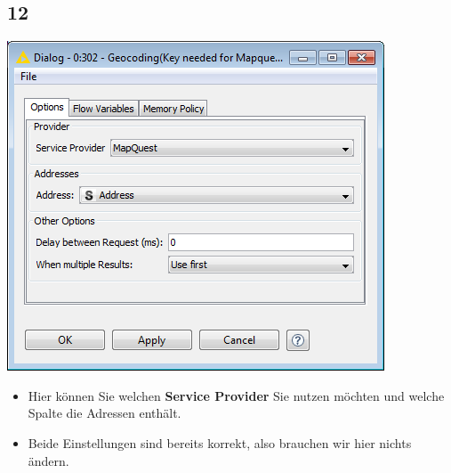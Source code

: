 \documentclass{beamer}
\begin{document}
\subsection{12}
\begin{frame}
	\begin{center}
  		\includegraphics[height=0.6\textheight]{12.png}
	\end{center}
	\begin{itemize}
		\item Hier können Sie welchen \textbf{Service Provider} Sie nutzen möchten und welche Spalte die Adressen enthält.
		\item Beide Einstellungen sind bereits korrekt, also brauchen wir hier nichts ändern.
	\end{itemize}
\end{frame}
\end{document}
